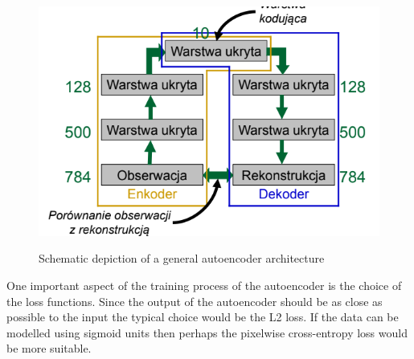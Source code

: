 \documentclass{myclass}
\begin{document}
\begin{figure}[ht]
   \centering
   \includegraphics[width=0.95\columnwidth]{figs/autoencoder.png}
   \label{fig:ae}
   \caption{Schematic depiction of a general autoencoder architecture}
\end{figure}

One important aspect of the training process of the autoencoder is the choice of the loss functions.
Since the output of the autoencoder should be as close as possible to the input the typical choice
would be the L2 loss. If the data can be modelled using sigmoid units then perhaps the pixelwise
cross-entropy loss would be more suitable.



\end{document}
